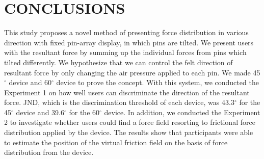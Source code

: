 \section{CONCLUSIONS}

This study proposes a novel method of presenting force distribution in various direction with fixed pin-array display, in which pins are tilted.
We present users with the resultant force by summing up the individual forces from pins which tilted differently.
We hypothesize that we can control the felt direction of resultant force by only changing the air pressure applied to each pin.
We made 45$^{\circ}$ device and 60$^{\circ}$ device to prove the concept.
With this system, we conducted the Experiment 1 on  how well users can discriminate the direction of the resultant force.
JND, which is the discrimination threshold of each device, was 43.3$^{\circ}$ for the 45$^{\circ}$ device and 39.6$^{\circ}$ for the 60$^{\circ}$ device.
In addition, we conducted the Experiment 2 to investigate whether users could find a force field resorting to frictional force distribution applied by the device.
The results show that participants were able to estimate the position of the virtual friction field on the basis of force distribution from the device.
